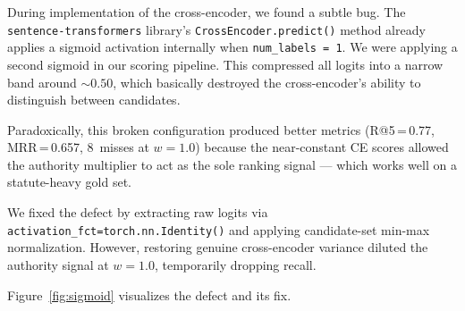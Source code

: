 \documentclass[11pt,a4paper,twocolumn]{article}
\begin{document}
During implementation of the cross-encoder, we found a subtle bug. The \texttt{sentence-transformers} library's \texttt{CrossEncoder.predict()} method already applies a sigmoid activation internally when \texttt{num\_labels\,=\,1}. We were applying a second sigmoid in our scoring pipeline. This compressed all logits into a narrow band around ${\sim}0.50$, which basically destroyed the cross-encoder's ability to distinguish between candidates.

Paradoxically, this broken configuration produced better metrics (R@5\,=\,0.77, MRR\,=\,0.657, 8~misses at $w{=}1.0$) because the near-constant CE scores allowed the authority multiplier to act as the sole ranking signal --- which works well on a statute-heavy gold set.

We fixed the defect by extracting raw logits via \texttt{activation\_fct=torch.nn.Identity()} and applying candidate-set min-max normalization. However, restoring genuine cross-encoder variance diluted the authority signal at $w{=}1.0$, temporarily dropping recall.

Figure~\ref{fig:sigmoid} visualizes the defect and its fix.
\end{document}
